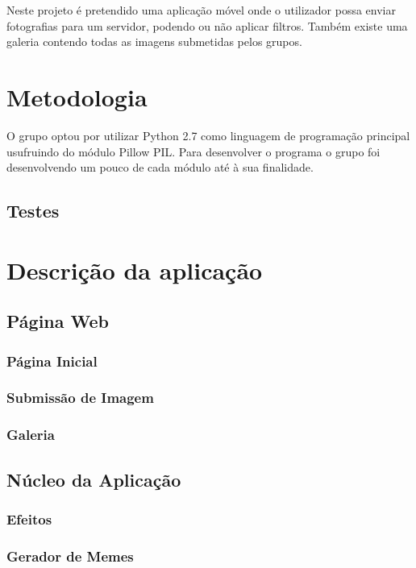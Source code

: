 \documentclass{report}
\begin{document}
Neste projeto é pretendido uma aplicação móvel onde o utilizador possa enviar fotografias para um servidor, podendo ou não aplicar filtros. Também existe uma galeria contendo todas as imagens submetidas pelos grupos.

\chapter{Metodologia}
\label{chap.metodologia}

O grupo optou por utilizar Python 2.7 como linguagem de programação principal usufruindo do módulo Pillow PIL. Para desenvolver o programa o grupo foi desenvolvendo um pouco de cada módulo até à sua finalidade.

\section{Testes}


\chapter{Descrição da aplicação}
\label{chap.desc}

\section{Página Web}


\subsection{Página Inicial}


\subsection{Submissão de Imagem}


\subsection{Galeria}

\section{Núcleo da Aplicação}

\subsection{Efeitos}

\subsection{Gerador de Memes}
\end{document}
